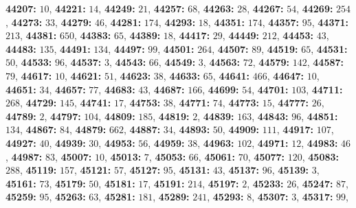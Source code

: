 \textsf{\bfseries 44207:} $10$, \textsf{\bfseries 44221:} $14$, \textsf{\bfseries 44249:} $21$, \textsf{\bfseries 44257:} $68$, \textsf{\bfseries 44263:} $28$, \textsf{\bfseries 44267:} $54$, \textsf{\bfseries 44269:} $254$, \textsf{\bfseries 44273:} $33$, \textsf{\bfseries 44279:} $46$, \textsf{\bfseries 44281:} $174$, \textsf{\bfseries 44293:} $18$, \textsf{\bfseries 44351:} $174$, \textsf{\bfseries 44357:} $95$, \textsf{\bfseries 44371:} $213$, \textsf{\bfseries 44381:} $650$, \textsf{\bfseries 44383:} $65$, \textsf{\bfseries 44389:} $18$, \textsf{\bfseries 44417:} $29$, \textsf{\bfseries 44449:} $212$, \textsf{\bfseries 44453:} $43$, \textsf{\bfseries 44483:} $135$, \textsf{\bfseries 44491:} $134$, \textsf{\bfseries 44497:} $99$, \textsf{\bfseries 44501:} $264$, \textsf{\bfseries 44507:} $89$, \textsf{\bfseries 44519:} $65$, \textsf{\bfseries 44531:} $50$, \textsf{\bfseries 44533:} $96$, \textsf{\bfseries 44537:} $3$, \textsf{\bfseries 44543:} $66$, \textsf{\bfseries 44549:} $3$, \textsf{\bfseries 44563:} $72$, \textsf{\bfseries 44579:} $142$, \textsf{\bfseries 44587:} $79$, \textsf{\bfseries 44617:} $10$, \textsf{\bfseries 44621:} $51$, \textsf{\bfseries 44623:} $38$, \textsf{\bfseries 44633:} $65$, \textsf{\bfseries 44641:} $466$, \textsf{\bfseries 44647:} $10$, \textsf{\bfseries 44651:} $34$, \textsf{\bfseries 44657:} $77$, \textsf{\bfseries 44683:} $43$, \textsf{\bfseries 44687:} $166$, \textsf{\bfseries 44699:} $54$, \textsf{\bfseries 44701:} $103$, \textsf{\bfseries 44711:} $268$, \textsf{\bfseries 44729:} $145$, \textsf{\bfseries 44741:} $17$, \textsf{\bfseries 44753:} $38$, \textsf{\bfseries 44771:} $74$, \textsf{\bfseries 44773:} $15$, \textsf{\bfseries 44777:} $26$, \textsf{\bfseries 44789:} $2$, \textsf{\bfseries 44797:} $104$, \textsf{\bfseries 44809:} $185$, \textsf{\bfseries 44819:} $2$, \textsf{\bfseries 44839:} $163$, \textsf{\bfseries 44843:} $96$, \textsf{\bfseries 44851:} $134$, \textsf{\bfseries 44867:} $84$, \textsf{\bfseries 44879:} $662$, \textsf{\bfseries 44887:} $34$, \textsf{\bfseries 44893:} $50$, \textsf{\bfseries 44909:} $111$, \textsf{\bfseries 44917:} $107$, \textsf{\bfseries 44927:} $40$, \textsf{\bfseries 44939:} $30$, \textsf{\bfseries 44953:} $56$, \textsf{\bfseries 44959:} $38$, \textsf{\bfseries 44963:} $102$, \textsf{\bfseries 44971:} $12$, \textsf{\bfseries 44983:} $46$, \textsf{\bfseries 44987:} $83$, \textsf{\bfseries 45007:} $10$, \textsf{\bfseries 45013:} $7$, \textsf{\bfseries 45053:} $66$, \textsf{\bfseries 45061:} $70$, \textsf{\bfseries 45077:} $120$, \textsf{\bfseries 45083:} $288$, \textsf{\bfseries 45119:} $157$, \textsf{\bfseries 45121:} $57$, \textsf{\bfseries 45127:} $95$, \textsf{\bfseries 45131:} $43$, \textsf{\bfseries 45137:} $96$, \textsf{\bfseries 45139:} $3$, \textsf{\bfseries 45161:} $73$, \textsf{\bfseries 45179:} $50$, \textsf{\bfseries 45181:} $17$, \textsf{\bfseries 45191:} $214$, \textsf{\bfseries 45197:} $2$, \textsf{\bfseries 45233:} $26$, \textsf{\bfseries 45247:} $87$, \textsf{\bfseries 45259:} $95$, \textsf{\bfseries 45263:} $63$, \textsf{\bfseries 45281:} $181$, \textsf{\bfseries 45289:} $241$, \textsf{\bfseries 45293:} $8$, \textsf{\bfseries 45307:} $3$, \textsf{\bfseries 45317:} $99$, 
